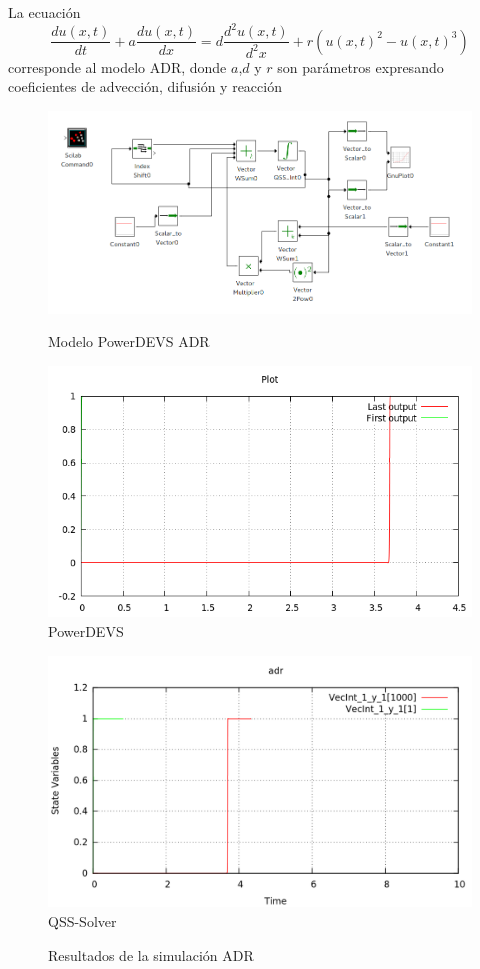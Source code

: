 La ecuación 
\begin{equation*}
\frac{du(x,t)}{dt} + a \frac{du(x,t)}{dx} = d\frac{d^2u(x,t)}{d^2x} + r(u(x,t)^2 - u(x,t)^3)
\end{equation*}
corresponde al modelo ADR, donde $a$,$d$ y $r$ son parámetros expresando coeficientes de advección, difusión y reacción

\begin{figure}[H]
 \includegraphics[width=0.75\linewidth]{adr-pwd}
\label{model:adr}
\caption{Modelo PowerDEVS ADR}
\end{figure}

\begin{figure}[H]
\begin{minipage}{0.5\textwidth}
 \includegraphics[width=\linewidth]{adr-pd}
\centering
PowerDEVS
\end{minipage}\hfill
\begin{minipage}{0.5\textwidth}
 \includegraphics[width=\linewidth]{adr-qss}
\centering
QSS-Solver
\end{minipage}
\label{graph:adr}
\caption{Resultados de la simulación ADR}
\end{figure}

